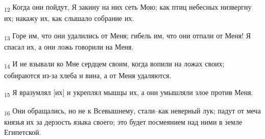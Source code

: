 \begin{tcolorbox}
\textsubscript{12} Когда они пойдут, Я закину на них сеть Мою; как птиц небесных низвергну их; накажу их, как слышало собрание их.
\end{tcolorbox}
\begin{tcolorbox}
\textsubscript{13} Горе им, что они удалились от Меня; гибель им, что они отпали от Меня! Я спасал их, а они ложь говорили на Меня.
\end{tcolorbox}
\begin{tcolorbox}
\textsubscript{14} И не взывали ко Мне сердцем своим, когда вопили на ложах своих; собираются из-за хлеба и вина, а от Меня удаляются.
\end{tcolorbox}
\begin{tcolorbox}
\textsubscript{15} Я вразумлял [их] и укреплял мышцы их, а они умышляли злое против Меня.
\end{tcolorbox}
\begin{tcolorbox}
\textsubscript{16} Они обращались, но не к Всевышнему, стали--как неверный лук; падут от меча князья их за дерзость языка своего; это будет посмеянием над ними в земле Египетской.
\end{tcolorbox}
